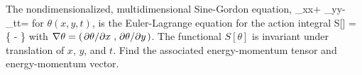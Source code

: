 \newcommand{\tht}{\theta}
\newcommand{\thtxx}{\tht_{xx}}
\newcommand{\thtyy}{\tht_{yy}}
\newcommand{\thttt}{\tht_{tt}}
\newcommand{\thtt}{\tht_t}
\newcommand{\thtx}{\tht_x}
\newcommand{\thty}{\tht_y}
\newcommand{\sint}{\sin{\tht}}
\newcommand{\dxdydt}{\dxdy \dd{t}}

\begin{statement}
	The nondimensionalized, multidimensional Sine-Gordon equation,
	\beq
		\thtxx + \thtyy - \thttt = \sint
	\eeq
	for $\tht(x, y, t)$, is the Euler-Lagrange equation for the action integral
	\beq
		S[\tht] = \intR \left\{  \left[ \thtt^2 - (\nabla\tht)^2 \right] - \sint \right\} \dxdydt
	\eeq
	with $\nabla\tht = (\pdv*{\tht}{x}, \pdv*{\tht}{y})$.  The functional $S[\tht]$ is invariant under translation of $x$, $y$, and $t$.  Find the associated energy-momentum tensor and energy-momentum vector.
\end{statement}

